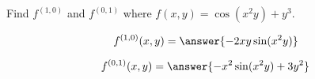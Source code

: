 \documentclass{ximera}
\author{David Guichard \and Neal Koblitz \and H. Jerome Keisler \and Albert Scheller \and Barry Balof \and Mike Wills \and Matthew Carr}
\begin{document}
\begin{exercise}




Find $f^{(1,0)}$ and $f^{(0,1)}$ where $f(x,y)=\cos(x^2 y)+y^3$.

\begin{prompt}
\[
f^{(1,0)}(x,y)=\answer{-2xy\sin(x^2y)}
\]
\end{prompt}

\begin{prompt}
\[
f^{(0,1)}(x,y)=\answer{-x^2 \sin(x^2 y)+3y^2}
\]
\end{prompt}

\end{exercise}
\end{document}
